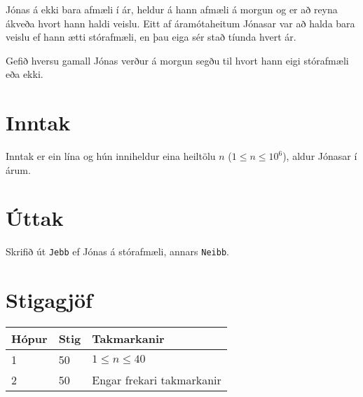 
Jónas á ekki bara afmæli í ár, heldur á hann afmæli á morgun og er að reyna ákveða hvort hann haldi veislu.
Eitt af áramótaheitum Jónasar var að halda bara veislu ef hann ætti stórafmæli, en
þau eiga sér stað tíunda hvert ár.

Gefið hversu gamall Jónas verður á morgun segðu til hvort hann eigi
stórafmæli eða ekki.

\section*{Inntak}
Inntak er ein lína og hún inniheldur eina heiltölu $n$ ($1 \leq n \leq
10^6$), aldur Jónasar í árum.

\section*{Úttak}
Skrifið út \texttt{Jebb} ef Jónas á stórafmæli, annars \texttt{Neibb}.

\section*{Stigagjöf}
\begin{tabular}{|l|l|l|}
\hline
Hópur & Stig & Takmarkanir \\ \hline
1     & 50   & $1 \leq n \leq 40$ \\ \hline
2     & 50   & Engar frekari takmarkanir\\ \hline
\end{tabular}

